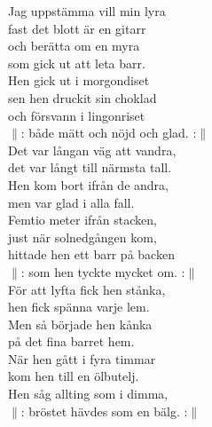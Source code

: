 \documentclass[a6paper,10pt]{article}
\begin{document}
\setlength{\oddsidemargin}{-0.47in}
\begin{center}
\end{center}
\begin{lyrics}
\small Jag uppstämma vill min lyra\\ 
fast det blott är en gitarr\\ 
och berätta om en myra\\ 
som gick ut att leta barr.\\ 
Hen gick ut i morgondiset\\ 
sen hen druckit sin choklad\\ 
och försvann i lingonriset\\ 
$\|$: både mätt och nöjd och glad. :$\|$
\vspace{5pt}\\ 
Det var långan väg att vandra,\\ 
det var långt till närmsta tall.\\ 
Hen kom bort ifrån de andra,\\ 
men var glad i alla fall.\\ 
Femtio meter ifrån stacken,\\ 
just när solnedgången kom,\\ 
hittade hen ett barr på backen\\ 
$\|$: som hen tyckte mycket om. :$\|$
\vspace{5pt}\\  
För att lyfta fick hen stånka,\\ 
hen fick spänna varje lem.\\
Men så började hen kånka\\ 
på det fina barret hem.\\ 
När hen gått i fyra timmar\\ 
kom hen till en ölbutelj.\\ 
Hen såg allting som i dimma,\\ 
$\|$: bröstet hävdes som en bälg. :$\|$
\vspace{5pt}\\  


\end{lyrics}
\end{document}
